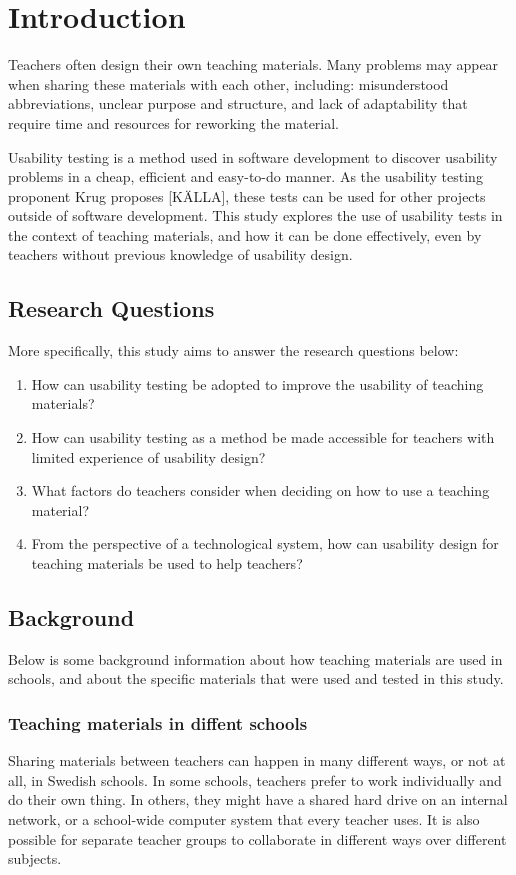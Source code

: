 \chapter{Introduction}

Teachers often design their own teaching materials. Many problems may appear when sharing these materials with each other, including: misunderstood abbreviations, unclear purpose and structure, and lack of adaptability that require time and resources for reworking the material.

Usability testing is a method used in software development to discover usability problems in a cheap, efficient and easy-to-do manner. As the usability testing proponent Krug proposes [KÄLLA], these tests can be used for other projects outside of software development. This study explores the use of usability tests in the context of teaching materials, and how it can be done effectively, even by teachers without previous knowledge of usability design.

\section{Research Questions}
More specifically, this study aims to answer the research questions below:

\begin{enumerate}
	\item How can usability testing be adopted to improve the usability of teaching materials?
	\item How can usability testing as a method be made accessible for teachers with limited experience of usability design?
	\item What factors do teachers consider when deciding on how to use a teaching material?
	\item From the perspective of a technological system, how can usability design for teaching materials be used to help teachers?
\end{enumerate}

\section{Background}
Below is some background information about how teaching materials are used in schools, and about the specific materials that were used and tested in this study.

\subsection{Teaching materials in diffent schools}
Sharing materials between teachers can happen in many different ways, or not at all, in Swedish schools. In some schools, teachers prefer to work individually and do their own thing. In others, they might have a shared hard drive on an internal network, or a school-wide computer system that every teacher uses. It is also possible for separate teacher groups to collaborate in different ways over different subjects.

